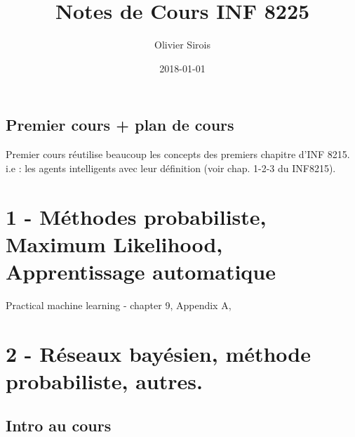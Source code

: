 \documentclass[oneside]{book}
\title{Notes de Cours INF 8225}
\date{2018-01-01}
\author{Olivier Sirois}
\begin{document}
\setcounter{page}{1}
\maketitle
\tableofcontents

\section{Premier cours  + plan de cours}
Premier cours réutilise beaucoup les concepts des premiers chapitre d'INF 8215. i.e :  les agents intelligents avec leur définition (voir chap. 1-2-3 du INF8215).  
\chapter{1 - Méthodes probabiliste, Maximum Likelihood, Apprentissage automatique}
Practical machine learning - chapter 9, Appendix A, 

\chapter{2 - Réseaux bayésien, méthode probabiliste, autres.}
\section{Intro au cours}
\end{document}
